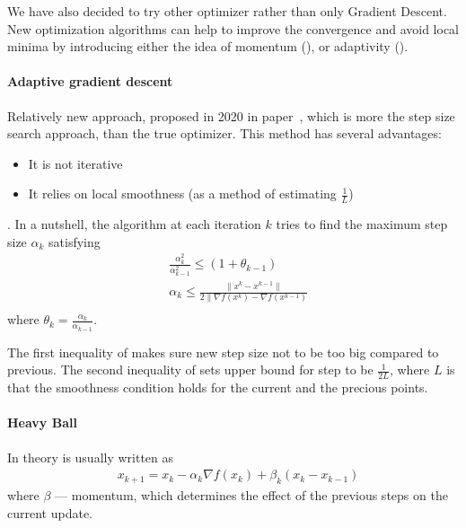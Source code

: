 \documentclass{article}
\begin{document}
We have also decided to try other optimizer rather than only Gradient Descent. New optimization algorithms can help to improve the convergence and avoid local minima by introducing either the idea of momentum (), or adaptivity ().

\paragraph{Adaptive gradient descent}
Relatively new approach, proposed in 2020 in paper~\cite{malitsky}, which is more the step size search approach, than the true optimizer. This method has several advantages:
\begin{itemize}
  \item It is not iterative
  \item It relies on local smoothness (as a method of estimating $\frac{1}{L}$)
\end{itemize}.
In a nutshell, the algorithm  at each iteration $k$ tries to find the maximum step size $\alpha_k$ satisfying
\begin{equation}\label{eq:adaptive}
  \begin{aligned}
     & \frac{\alpha^2_k}{\alpha^2_{k-1}} \leq (1+\theta_{k-1})                        \\
     & \alpha_k \leq \frac{\|x^k - x^{k-1} \|}{2 \|\nabla f(x^k) - \nabla f(x^{k-1})} \\
  \end{aligned}
\end{equation}
where $\theta_k = \frac{\alpha_k}{\alpha_{k-1}}$.

The first inequality of  makes sure new step size not to be too big compared to previous. The second inequality of  sets upper bound for step to be $\frac{1}{2L}$, where $L$ is that the smoothness condition holds for the current and the precious points.


\paragraph{Heavy Ball}
In theory is usually written as
\begin{align*}
   & x_{k+1} = x_k - \alpha_k  \nabla f(x_k) + \beta_k (x_k - x_{k-1})
\end{align*}
where $\beta$ --- momentum, which determines the effect of the previous steps on the current update.
\end{document}
